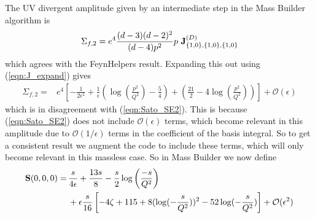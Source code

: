 \documentclass[11pt]{article}
\newcommand{\mb}{\textsf{Mass Builder} }
\begin{document}
The UV divergent amplitude given by an intermediate step in the \mb algorithm is
\begin{align}
\Sigma_{f,2} = e^4 \frac{(d-3)(d-2)^2}{(d-4)p^2} p \ \bold{J}_{ \{1,0\}, \{1,0\}, \{1,0\}}^{(D)}
\end{align}
which agrees with the FeynHelpers result.  Expanding this out using (\ref{eqn:J_expand}) gives
\begin{align}
\Sigma_{f,2} = &e^4 \left[ -\frac{1}{2\epsilon^2} + \frac{1}{\epsilon}\left(\log\left(\frac{p^2}{Q^2}\right)-\frac{5}{4}\right) + \left( \frac{21}{2}-4\log\left(\frac{p^2}{Q^2}\right)\right) \right] + \mathcal{O}(\epsilon)
\end{align}
which is in disagreement with (\ref{eqn:Sato_SE2}).  This is because (\ref{eqn:Sato_SE2}) does not include $\mathcal{O}(\epsilon)$ terms, which become relevant in this amplitude due to $ \mathcal{O}(1/\epsilon)$ terms in the coefficient of the basis integral.  So to get a consistent result we augment the code to include these terms, which will only become relevant in this massless case.  So in \mb we now define
\begin{align}
\begin{split}
\bold{S}(0,0,0) = \, & \frac{s}{4\epsilon} + \frac{13s}{8}-\frac{s}{2}\log\left(\frac{-s}{Q^2}\right) \\&+\epsilon\frac{s}{16}  \left[-4 \zeta + 115 + 8 (\log(-\frac{s}{Q^2}))^2 - 52 \log(-\frac{s}{Q^2})\right] + \mathcal{O}(\epsilon^2)
\end{split}
\end{align}
\end{document}
